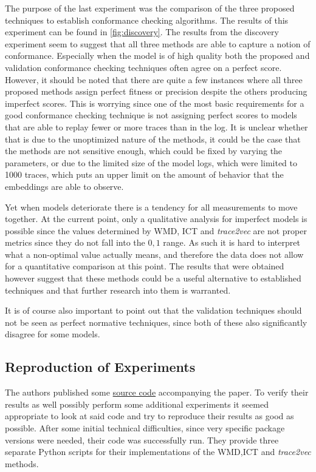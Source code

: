 \documentclass[runningheads]{template/llncs}
\begin{document}
The purpose of the last experiment was the comparison of the three proposed techniques to establish conformance checking algorithms.
The results of this experiment can be found in \cref{fig:discovery}.
The results from the discovery experiment seem to suggest that all three methods are able to capture a notion of conformance.
Especially when the model is of high quality both the proposed and validation conformance checking techniques often agree on a perfect score.
However, it should be noted that there are quite a few instances where all three proposed methods assign perfect fitness or precision despite the others producing imperfect scores.
This is worrying since one of the most basic requirements for a good conformance checking technique is not assigning perfect scores to models that are able to replay fewer or more traces than in the log.
It is unclear whether that is due to the unoptimized nature of the methods, it could be the case that the methods are not sensitive enough, which could be fixed by varying the parameters, or due to the limited size of the model logs, which were limited to 1000 traces, which puts an upper limit on the amount of behavior that the embeddings are able to observe.

Yet when models deteriorate there is a tendency for all measurements to move together.
At the current point, only a qualitative analysis for imperfect models is possible since the values determined by WMD, ICT and \emph{trace2vec} are not proper metrics since they do not fall into the $0,1$ range.
As such it is hard to interpret what a non-optimal value actually means, and therefore the data does not allow for a quantitative comparison  at this point.
The results that were obtained however suggest that these methods could be a useful alternative to established techniques and that further research into them is warranted.

It is of course also important to point out that the validation techniques should not be seen as perfect normative techniques, since both of these also significantly disagree for some models. 

\subsection{Reproduction of Experiments}
The authors published some \href{https://github.com/jaripeeperkorn/Conformance-checking-using-activity-and-trace-embeddings}{source code} accompanying the paper.
To verify their results as well possibly perform some additional experiments it seemed appropriate to look at said code and try to reproduce their results as good as possible.
After some initial technical difficulties, since very specific package versions were needed, their code was successfully run.
They provide three separate Python scripts for their implementations of the  WMD,ICT and \emph{trace2vec} methods.
\end{document}
